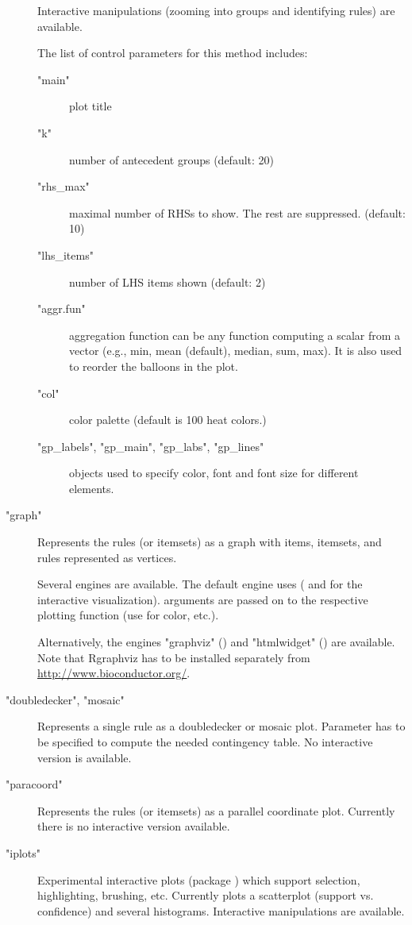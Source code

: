 \documentclass[letterpaper]{book}
\begin{document}
\begin{Details}
\begin{description}
Interactive manipulations (zooming into groups and identifying rules) are available. 

The list of control parameters for this method includes:
\begin{description}

\item["main"] plot title
\item["k"] number of antecedent groups (default: 20)
\item["rhs\_max"] maximal number of RHSs to show. The rest are 
suppressed. (default: 10)
\item["lhs\_items"] number of LHS items shown (default: 2)
\item["aggr.fun"] aggregation function
can be any function computing a scalar from a vector
(e.g., min, mean (default), median, sum, max). It is also used
to reorder the balloons in the plot.
\item["col"] color palette (default is 100 heat colors.)
\item["gp\_labels", "gp\_main", "gp\_labs", "gp\_lines"]  objects used to specify color, font and font size for
different elements.

\end{description}



\item["graph"] 
Represents the rules (or itemsets) as a graph with items, itemsets, and
rules represented as vertices.

Several engines are available. The default engine uses  ( and  for the interactive visualization). 
 arguments are passed on to the respective plotting function (use for color, etc.).

Alternatively, the engines "graphviz" () and "htmlwidget" () are available.
Note that Rgraphviz has to be installed separately from 
\url{http://www.bioconductor.org/}.


\item["doubledecker", "mosaic"] 
Represents a single rule as a doubledecker or mosaic plot.
Parameter  has to be specified to compute the needed contingency
table. No interactive version is available.


\item["paracoord"] 
Represents the rules (or itemsets) as a parallel coordinate plot.
Currently there is no interactive version available.


\item["iplots"] 
Experimental interactive plots (package ) 
which support selection, highlighting, 
brushing, etc. Currently plots a scatterplot (support vs. confidence) and
several histograms. Interactive manipulations are available. 



\end{description}

\end{Details}
\end{document}
